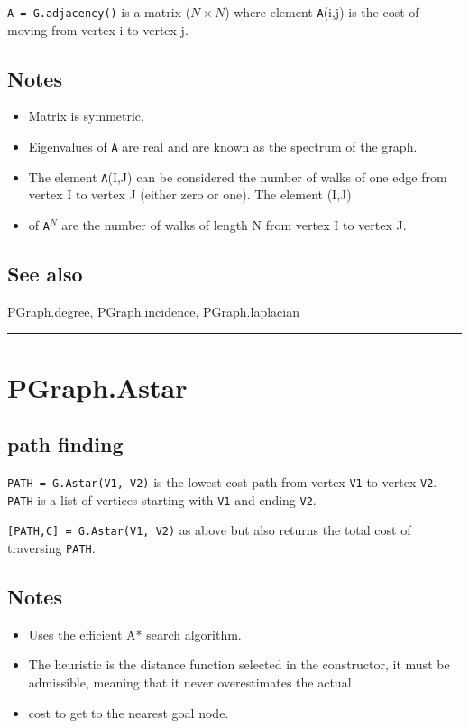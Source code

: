 \texttt{A = G.adjacency()} is a matrix ($N \times N$) where element \texttt{A}(i,j) is the cost
of moving from vertex i to vertex j.


\subsection*{Notes}
\begin{itemize}
  \item Matrix is symmetric.
  \item Eigenvalues of \texttt{A} are real and are known as the spectrum of the graph.
  \item The element \texttt{A}(I,J) can be considered the number of walks of one    edge from vertex I to vertex J (either zero or one).  The element (I,J)
  \item of \texttt{A}${}^{N}$ are the number of walks of length N from vertex I to vertex J.
\end{itemize}

\subsection*{See also}


\hyperlink{PGraph.degree}{\color{blue} PGraph.degree}, \hyperlink{PGraph.incidence}{\color{blue} PGraph.incidence}, \hyperlink{PGraph.laplacian}{\color{blue} PGraph.laplacian}

\vspace{1.5ex}\hrule

\hypertarget{PGraph.Astar}{\section*{PGraph.Astar}}
\subsection*{path finding}


\texttt{PATH = G.Astar(V1, V2)} is the lowest cost path from vertex \texttt{V1} to
vertex \texttt{V2}.  \texttt{PATH} is a list of vertices starting with \texttt{V1} and ending
\texttt{V2}.



\texttt{[PATH,C] = G.Astar(V1, V2)} as above but also returns the total cost
of traversing \texttt{PATH}.


\subsection*{Notes}
\begin{itemize}
  \item Uses the efficient A* search algorithm.
  \item The heuristic is the distance function selected in the constructor, it    must be  admissible, meaning that it never overestimates the actual
  \item cost to get to the nearest goal node.
\end{itemize}

